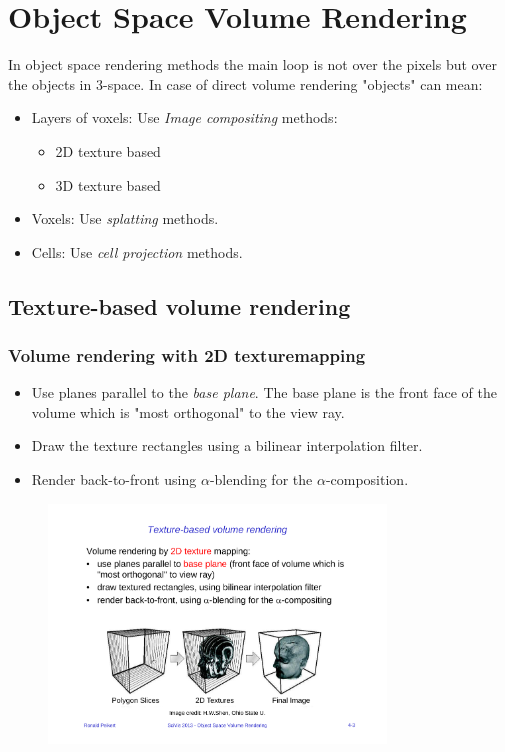 \section{Object Space Volume Rendering}
In object space rendering methods the main loop is not over the pixels but over the objects in $3$-space. In case of direct volume rendering "objects" can mean:
\begin{itemize}
    \item Layers of voxels: Use \emph{Image compositing} methods:
        \begin{itemize}
            \item 2D texture based
            \item 3D texture based
        \end{itemize}
    \item Voxels: Use \emph{splatting} methods.
    \item Cells: Use \emph{cell projection} methods.
\end{itemize}

\subsection{Texture-based volume rendering}
\subsubsection{Volume rendering with 2D texturemapping}
\begin{itemize}
    \item Use planes parallel to the \emph{base plane}. The base plane is the front face of the volume which is "most orthogonal" to the view ray.
    \item Draw the texture rectangles using a bilinear interpolation filter.
    \item Render back-to-front using $\alpha$-blending for the $\alpha$-composition.
\end{itemize}
\begin{figure}[H]
    \centering
    \includegraphics[width=0.8\textwidth]{img/04_texture_based_volume_rendering}
\end{figure}

